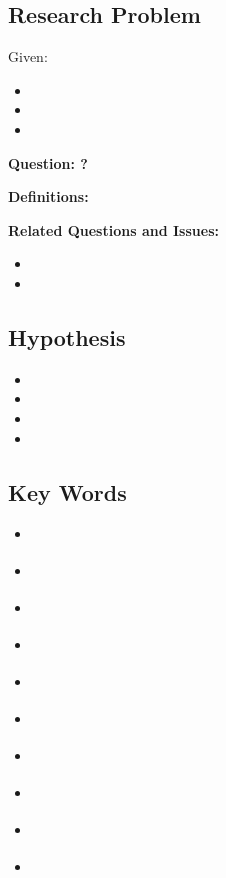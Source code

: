 \documentclass[12pt,a4paper]{article}
\begin{document}
\subsection*{Research Problem}
Given:
\begin{itemize}
    \item
    \item 
    \item 
\end{itemize}
\textbf{Question: ?}

\textbf{Definitions:}

\textbf{Related Questions and Issues:}
\begin{itemize}
    \item 
    \item 
\end{itemize}

\subsection*{Hypothesis}
\begin{itemize}
    \item 
    \item 
    \item 
    \item 
\end{itemize}

\subsection*{Key Words}
\begin{itemize}
    \item \textbf{}
    \item \textbf{}
    \item \textbf{}
    \item \textbf{}
    \item \textbf{}
    \item \textbf{}
    \item \textbf{}
    \item \textbf{ }
    \item \textbf{}
    \item \textbf{}
\end{itemize}
\end{document}
